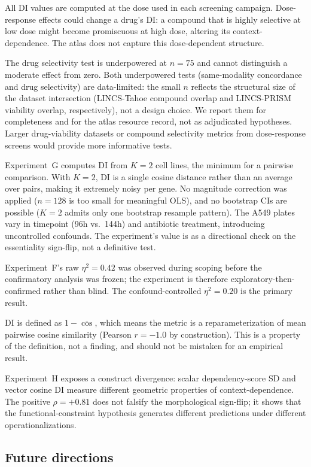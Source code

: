 \documentclass[11pt]{article}
\begin{document}
All DI values are computed at the dose used in each screening campaign.
Dose-response effects could change a drug's DI: a compound that is
highly selective at low dose might become promiscuous at high dose,
altering its context-dependence.  The atlas does not capture this
dose-dependent structure.

The drug selectivity test is underpowered at $n = 75$ and cannot
distinguish a moderate effect from zero.  Both underpowered tests
(same-modality concordance and drug selectivity) are data-limited: the small $n$ reflects the structural size of
the dataset intersection (LINCS-Tahoe compound overlap and LINCS-PRISM
viability overlap, respectively), not a design choice.  We report them
for completeness and for the atlas resource record, not as adjudicated
hypotheses.  Larger drug-viability datasets or compound selectivity
metrics from dose-response screens would provide more informative tests.

Experiment~G computes DI from $K = 2$ cell lines, the minimum for a
pairwise comparison.  With $K = 2$, DI is a single cosine distance
rather than an average over pairs, making it extremely noisy per gene.
No magnitude correction was applied ($n = 128$ is too small for
meaningful OLS), and no bootstrap CIs are possible ($K = 2$ admits
only one bootstrap resample pattern).  The A549 plates vary in timepoint
(96h vs.\ 144h) and antibiotic treatment, introducing uncontrolled
confounds.  The experiment's value is as a directional check on the
essentiality sign-flip, not a definitive test.

Experiment~F's raw $\eta^2 = 0.42$ was observed during scoping before
the confirmatory analysis was frozen; the experiment is therefore
exploratory-then-confirmed rather than blind.  The confound-controlled
$\eta^2 = 0.20$ is the primary result.

DI is defined as $1 - \overline{\cos}$, which means the metric is a
reparameterization of mean pairwise cosine similarity (Pearson
$r = -1.0$ by construction).  This is a property of the definition, not
a finding, and should not be mistaken for an empirical result.

Experiment~H exposes a construct divergence: scalar dependency-score SD
and vector cosine DI measure different geometric properties of
context-dependence.  The positive $\rho = +0.81$ does not falsify the
morphological sign-flip; it shows that the functional-constraint
hypothesis generates different predictions under different operationalizations.

\subsection{Future directions}
\end{document}
